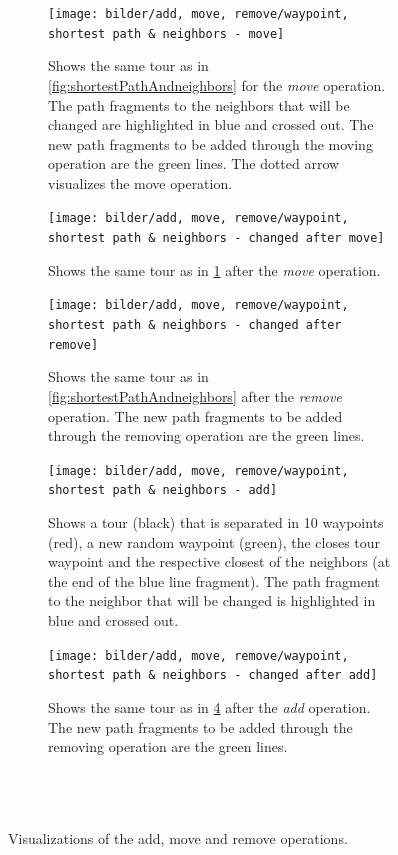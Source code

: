 \begin{figure}[H]
	\centering
	\begin{subfigure}{0.55\textwidth}
		\texttt{[image: bilder/add, move, remove/waypoint, shortest path \& neighbors - move]}
		\caption{Shows the same tour as in \ref{fig:shortestPathAndneighbors} for the \textit{move} operation. 
			The path fragments to the neighbors that will be changed are highlighted in blue and crossed out. The new path fragments to be added through the moving operation are the green lines. The dotted arrow visualizes the move operation.}
		\label{fig:shortestPahtAndMove}
	\end{subfigure}
	\begin{subfigure}{0.48\textwidth}
		\texttt{[image: bilder/add, move, remove/waypoint, shortest path \& neighbors - changed after move]}
		\caption{Shows the same tour as in \ref{fig:shortestPahtAndMove} after the \textit{move} operation.}
		\label{fig:shortestPathAndMoveDone}
	\end{subfigure}\hfill
	\begin{subfigure}{0.5\textwidth}
	\texttt{[image: bilder/add, move, remove/waypoint, shortest path \& neighbors - changed after remove]}
	\caption{Shows the same tour as in \ref{fig:shortestPathAndneighbors} after the \textit{remove} operation. The new path fragments to be added through the removing operation are the green lines.}
	\label{fig:shortestPahtAndRemoveDone}
	\end{subfigure}
	
	\begin{subfigure}{0.45\textwidth}
	\texttt{[image: bilder/add, move, remove/waypoint, shortest path \& neighbors - add]}
	\caption{Shows a tour (black) that is separated in 10 waypoints (red), a new random waypoint (green), the closes tour waypoint and the respective closest of the neighbors (at the end of the blue line fragment). 
		The path fragment to the neighbor that will be changed is highlighted in blue and crossed out.}
	\label{fig:shortestPathAndAdd}
	\end{subfigure}\hfill
	\begin{subfigure}{0.45\textwidth}
	\texttt{[image: bilder/add, move, remove/waypoint, shortest path \& neighbors - changed after add]}
	\caption{Shows the same tour as in \ref{fig:shortestPathAndAdd} after the \textit{add} operation. The new path fragments to be added through the removing operation are the green lines.\textcolor{white}{a\\a\\a\\a}}
	\label{fig:shortestPathAndAddDone}
	\end{subfigure}
	\caption{Visualizations of the add, move and remove operations.}
	\label{fig:addMoveRemove}
\end{figure}



